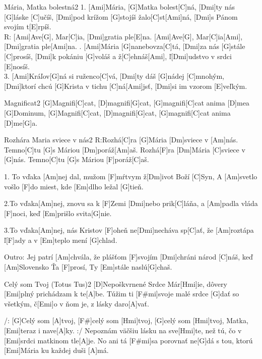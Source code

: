 \documentclass[12pt]{article}
\begin{document}
\begin{song}{Mária, Matka bolestná}{2}
	1. [Ami]Mária, [G]Matka bolest[C]ná, 
	[Dmi]ty nás [G]láske [C]učíš,
	[Dmi]pod krížom [G]stojíš žalo[C]st[Ami]ná, 
	[Dmi]s Pánom svojím t[E]rpíš.
	\\
	R: [Ami]Ave[G], Mar[C]ia, 
	[Dmi]gratia ple[E]na. 
	[Ami]Ave[G], Mar[C]ia[Ami], 
	[Dmi]gratia ple[Ami]na.
	. [Ami]Mária [G]nanebovza[C]tá,
	[Dmi]za nás [G]stále [C]prosíš,
	[Dmi]k pokániu [G]voláš a ž[C]ehnáš[Ami], 
	ľ[Dmi]udstvo v srdci [E]nosíš.
	\\
	3. [Ami]Kráľov[G]ná si ruženco[C]vá, 
	[Dmi]ty dáš [G]nádej [C]mnohým,
	[Dmi]ktorí chcú [G]Krista v tichu [C]ná[Ami]jsť, 
	[Dmi]si im vzorom [E]veľkým.
\end{song}

\begin{song}{Magnificat}{2}
	[G]Magnifi[C]cat, [D]magnifi[G]cat,
	[G]magnifi[C]cat anima [D]mea [G]Dominum,
	[G]Magnifi[C]cat, [D]magnifi[G]cat,
	[G]magnifi[C]cat anima [D]me[G]a.
	\columnbreak
\end{song}


\begin{song}{Rozhára Maria sviece v nás}{2}
	R:Rozhá[C]ra [G]Mária [Dm]sviece v [Am]nás.
	Temno[C]tu [G]s Máriou [Dm]poráž[Am]aš.
	Rozhá[F]ra [Dm]Mária [C]sviece v [G]nás.
	Temno[C]tu [G]s Máriou [F]poráž[C]aš.
	
	1. To vďaka [Am]nej dal, mužom [F]mŕtvym ž[Dm]ivot Boží [C]Syn,
	A [Am]svetlo vošlo [F]do miest, kde [Em]dlho ležal [G]tieň.
	
	\columnbreak
	2.To vďaka[Am]nej, znovu sa k [F]Zemi [Dmi]nebo prik[C]láňa,
	a [Am]padla vláda [F]noci, keď [Em]prišlo svita[G]nie.
	
	3.To vďaka[Am]nej, nás Kristov [F]oheň ne[Dmi]necháva sp[C]ať,
	že [Am]roztápa ľ[F]ady a v [Em]teplo mení [G]chlad.
	
	Outro:
	Jej patrí [Am]chvála, že plášťom [F]svojím [Dmi]chráni národ [C]náš,
	keď [Am]Slovensko Ťa [F]prosí, Ty [Em]stále naslú[G]chaš.
\end{song}


\begin{song}{Celý som Tvoj (Totus Tus)}{2}
	[D]Nepoškvrnené Srdce Már[Hmi]ie,
	dôvery [Emi]plný prichádzam k te[A]be.
	Túžim ti [F#mi]svoje malé srdce [G]dať
	so všetkým, č[Emi]o v ňom je,
	z lásky daro[A]vať.
	
	/: [G]Celý som [A]tvoj, [F#]celý som [Hmi]tvoj,
	[G]celý som [Hmi]tvoj, Matka,[Emi]teraz i nave[A]ky. :/
	\columnbreak
	[D]Nepoznám väčšiu lásku na sve[Hmi]te,
	než tú, čo v [Emi]srdci matkinom tle[A]je.
	No ani tá [F#mi]sa porovnať ne[G]dá s tou,
	ktorú [Emi]Mária ku každej duši [A]má.
\end{song}
\end{document}

